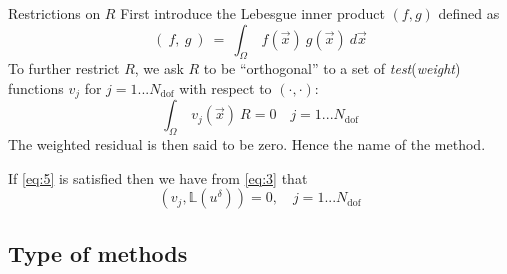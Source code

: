 \begin{frame}{Restrictions on $R$}
  First introduce the Lebesgue inner product $(f,g)$ defined as
  \begin{equation}
    \label{eq:4}
    (\ f,\ g\ )\ =\ \int_\Omega \ f(\overrightarrow{x})\ g(\overrightarrow{x})\ d\overrightarrow{x}
  \end{equation}
  To further restrict $R$, we ask $R$ to be ``orthogonal'' to a set of
  \emph{test}(\emph{weight}) functions $v_j$ for
  $j=1...N_{\text{dof}}$ with respect to $(\cdot, \cdot)$:
  \begin{equation}
    \label{eq:5}
    \int_\Omega\ v_j(\overrightarrow{x})\ R  = 0 \quad j = 1 ... N_{\text{dof}}
  \end{equation}
  The weighted residual is then said to be zero. Hence the name of the method.

  If \eqref{eq:5} is satisfied then we have from \eqref{eq:3} that
  \begin{equation}
    \label{eq:58}
    (v_j, \mathbb{L}(u^\delta) ) = 0, \quad j=1...N_{\text{dof}}
  \end{equation}
\end{frame}

\subsection{Type of methods}
\label{sec:type-methods}


